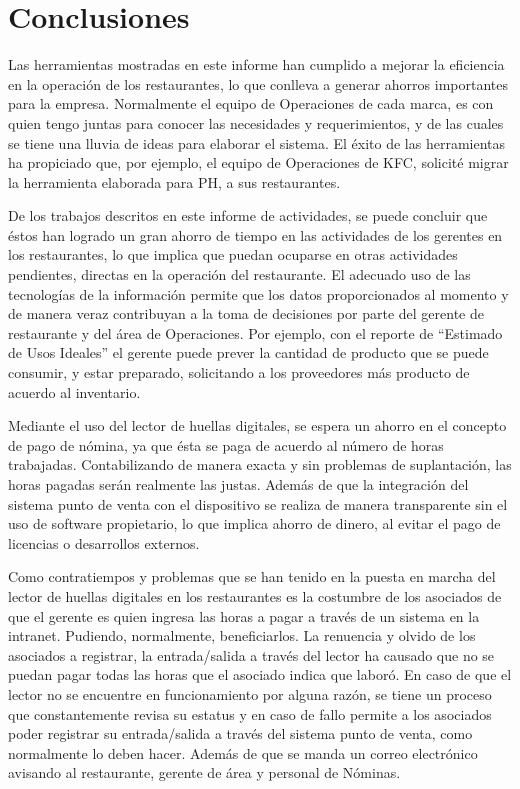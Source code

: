 
\chapter*{Conclusiones}
\pagestyle{plain}
\label{chap:conclusiones}

Las herramientas mostradas en este informe han cumplido a mejorar la eficiencia en la operación de los restaurantes, lo que conlleva a generar ahorros importantes para la empresa. Normalmente el equipo de Operaciones de cada marca, es con quien tengo juntas para conocer las necesidades y requerimientos, y de las cuales se tiene una lluvia de ideas para elaborar el sistema. El éxito de las herramientas ha propiciado que, por ejemplo, el equipo de Operaciones de KFC, solicité migrar la herramienta elaborada para PH, a sus restaurantes.

De los trabajos descritos en este informe de actividades, se puede concluir que éstos han logrado un gran ahorro de tiempo en las actividades de los gerentes en los restaurantes, lo que implica que puedan ocuparse en otras actividades pendientes, directas en la operación del restaurante. El adecuado uso de las tecnologías de la información permite que los datos proporcionados al momento y de manera veraz contribuyan a la toma de decisiones por parte del gerente de restaurante y del área de Operaciones. Por ejemplo, con el reporte de ``Estimado de Usos Ideales'' el gerente puede prever la cantidad de producto que se puede consumir, y estar preparado, solicitando a los proveedores más producto de acuerdo al inventario.

Mediante el uso del lector de huellas digitales, se espera un ahorro en el concepto de pago de nómina, ya que ésta se paga de acuerdo al número de horas trabajadas. Contabilizando de manera exacta y sin problemas de suplantación, las horas pagadas serán realmente las justas. Además de que la integración del sistema punto de venta con el dispositivo se realiza de manera transparente sin el uso de software propietario, lo que implica ahorro de dinero, al evitar el pago de licencias o desarrollos externos.

Como contratiempos y problemas que se han tenido en la puesta en marcha del lector de huellas digitales en los restaurantes es la costumbre de los asociados de que el gerente es quien ingresa las horas a pagar a través de un sistema en la intranet. Pudiendo, normalmente, beneficiarlos. La renuencia y olvido de los asociados a registrar, la entrada/salida a través del lector ha causado que no se puedan pagar todas las horas que el asociado indica que laboró. En caso de que el lector no se encuentre en funcionamiento por alguna razón, se tiene un proceso que constantemente revisa su estatus y en caso de fallo permite a los asociados poder registrar su entrada/salida a través del sistema punto de venta, como normalmente lo deben hacer. Además de que se manda un correo electrónico avisando al restaurante, gerente de área y personal de Nóminas.

